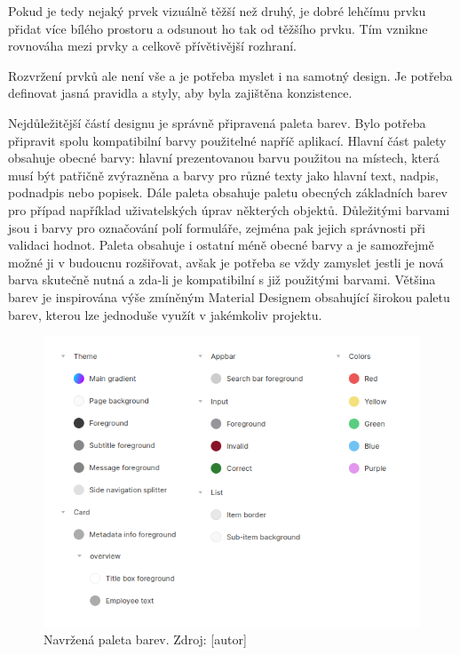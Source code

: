 		Pokud je tedy nejaký prvek vizuálně těžší než druhý, je dobré lehčímu prvku přidat více bílého prostoru a odsunout
		ho tak od těžšího prvku.
		Tím vznikne rovnováha mezi prvky a celkově přívětivější rozhraní.
		\cite{vizualni_rovnovaha}

		Rozvržení prvků ale není vše a je potřeba myslet i na samotný design.
		Je potřeba definovat jasná pravidla a styly, aby byla zajištěna konzistence.

		Nejdůležitější částí designu je správně připravená paleta barev.
		Bylo potřeba připravit spolu kompatibilní barvy použitelné napříč aplikací.
		Hlavní část palety obsahuje obecné barvy: hlavní prezentovanou barvu použitou na místech, která musí být
		patřičně zvýrazněna a barvy pro různé texty jako hlavní text, nadpis, podnadpis nebo popisek.
		Dále paleta obsahuje paletu obecných základních barev pro případ například uživatelských úprav některých objektů.
		Důležitými barvami jsou i barvy pro označování polí formuláře, zejména pak jejich správnosti při validaci
		hodnot.
		Paleta obsahuje i ostatní méně obecné barvy a je samozřejmě možné ji v budoucnu rozšiřovat, avšak je potřeba se
		vždy zamyslet jestli je nová barva skutečně nutná a zda-li je kompatibilní s již použitými barvami.
		Většina barev je inspirována výše zmíněným Material Designem obsahující širokou paletu barev, kterou lze jednoduše
		využít v jakémkoliv projektu.

		\begin{figure}[H]
			\centering
			\includegraphics[width=\linewidth]{obrazky/paleta_barev}\hfill
			\caption{Navržená paleta barev. Zdroj: [autor]}
		\end{figure}


